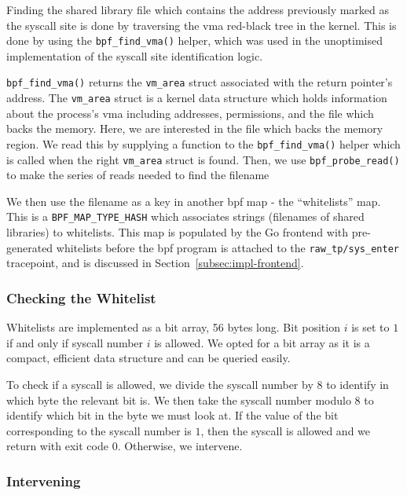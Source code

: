 Finding the shared library file which contains the address previously marked as
the syscall site is done by traversing the \ac{vma} red-black tree in the
kernel. This is done by using the \texttt{bpf\_find\_vma()} helper, which was used
in the unoptimised implementation of the syscall site identification logic.

\texttt{bpf\_find\_vma()} returns the \texttt{vm\_area} struct associated with the
return pointer's address. The \texttt{vm\_area} struct is a kernel data structure
which holds information about the process's \ac{vma} including addresses,
permissions, and the file which backs the memory. Here, we are interested in the
file which backs the memory region. We read this by supplying a function
to the \texttt{bpf\_find\_vma()} helper which is called when the right
\texttt{vm\_area} struct is found. Then, we use \texttt{bpf\_probe\_read()} to make
the series of reads needed to find the filename

We then use the filename as a key in another \ac{bpf} map - the ``whitelists''
map. This is a \texttt{BPF\_MAP\_TYPE\_HASH} which associates strings (filenames
of shared libraries) to whitelists. This map is populated by the Go frontend
with pre-generated whitelists before the \ac{bpf} program is attached to the 
\texttt{raw\_tp/sys\_enter} tracepoint, and is discussed in 
Section~\ref{subsec:impl-frontend}.

\subsubsection{Checking the Whitelist}

Whitelists are implemented as a bit array, 56 bytes long. Bit position $i$ is
set to $1$ if and only if syscall number $i$ is allowed. We opted for a bit
array as it is a compact, efficient data structure and can be queried easily.

To check if a syscall is allowed, we divide the syscall number by 8 to identify in 
which byte the relevant bit is. We then take the syscall number modulo 8 to
identify which bit in the byte we must look at. If the value of the bit
corresponding to the syscall number is $1$, then the syscall is allowed and we
return with exit code 0. Otherwise, we intervene.

\subsubsection{Intervening}\label{subsubsec:impl-intervening}

